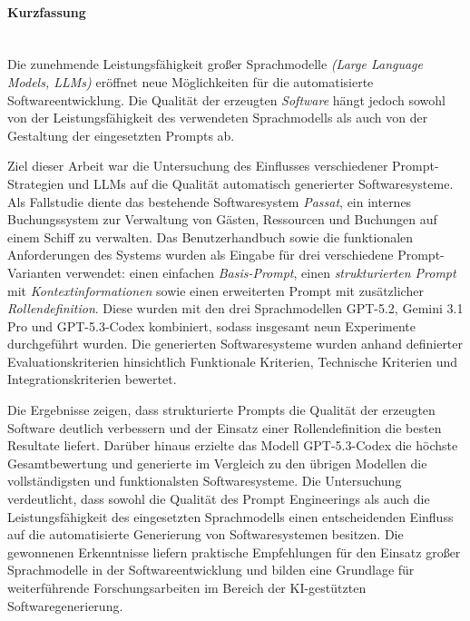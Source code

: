 
\cleardoublepage
\thispagestyle{plain}

\paragraph{Kurzfassung}\mbox{}\\



Die zunehmende Leistungsfähigkeit großer Sprachmodelle \textit{(Large Language Models, LLMs)} eröffnet neue Möglichkeiten für die automatisierte Softwareentwicklung. Die Qualität der erzeugten \textit{Software} hängt jedoch sowohl von der Leistungsfähigkeit des verwendeten Sprachmodells als auch von der Gestaltung der eingesetzten Prompts ab.

Ziel dieser Arbeit war die Untersuchung des Einflusses verschiedener Prompt-Strategien und LLMs auf die Qualität automatisch generierter Softwaresysteme.
Als Fallstudie diente das bestehende Softwaresystem \textit{Passat}, ein internes Buchungssystem zur Verwaltung von Gästen, Ressourcen und Buchungen auf einem Schiff zu verwalten. Das Benutzerhandbuch sowie die funktionalen Anforderungen des Systems wurden als Eingabe für drei verschiedene Prompt-Varianten verwendet: einen einfachen \textit{Basis-Prompt}, einen \textit{strukturierten Prompt} mit \textit{Kontextinformationen} sowie einen erweiterten Prompt mit zusätzlicher \textit{Rollendefinition}. Diese wurden mit den drei Sprachmodellen GPT-5.2, Gemini 3.1 Pro und GPT-5.3-Codex kombiniert, sodass insgesamt neun Experimente durchgeführt wurden. Die generierten Softwaresysteme wurden anhand definierter Evaluationskriterien hinsichtlich Funktionale Kriterien, Technische Kriterien und Integrationskriterien bewertet.


Die Ergebnisse zeigen, dass strukturierte Prompts die Qualität der erzeugten Software deutlich verbessern und der Einsatz einer Rollendefinition die besten Resultate liefert. Darüber hinaus erzielte das Modell GPT-5.3-Codex die höchste Gesamtbewertung und generierte im Vergleich zu den übrigen Modellen die vollständigsten und funktionalsten Softwaresysteme. Die Untersuchung verdeutlicht, dass sowohl die Qualität des Prompt Engineerings als auch die Leistungsfähigkeit des eingesetzten Sprachmodells einen entscheidenden Einfluss auf die automatisierte Generierung von Softwaresystemen besitzen. Die gewonnenen Erkenntnisse liefern praktische Empfehlungen für den Einsatz großer Sprachmodelle in der Softwareentwicklung und bilden eine Grundlage für weiterführende Forschungsarbeiten im Bereich der KI-gestützten Softwaregenerierung.

